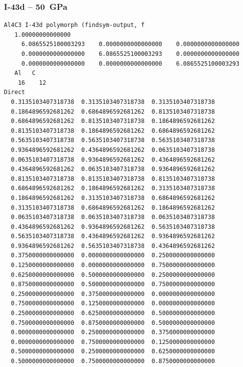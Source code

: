 \subsubsection*{I-43d -- 50~GPa}
\begin{footnotesize}
\begin{verbatim}
Al4C3 I-43d polymorph (findsym-output, f
   1.00000000000000     
     6.0865525100003293    0.0000000000000000    0.0000000000000000
     0.0000000000000000    6.0865525100003293    0.0000000000000000
     0.0000000000000000    0.0000000000000000    6.0865525100003293
   Al   C 
    16    12
Direct
  0.3135103407318738  0.3135103407318738  0.3135103407318738
  0.1864896592681262  0.6864896592681262  0.8135103407318738
  0.6864896592681262  0.8135103407318738  0.1864896592681262
  0.8135103407318738  0.1864896592681262  0.6864896592681262
  0.5635103407318738  0.5635103407318738  0.5635103407318738
  0.9364896592681262  0.4364896592681262  0.0635103407318738
  0.0635103407318738  0.9364896592681262  0.4364896592681262
  0.4364896592681262  0.0635103407318738  0.9364896592681262
  0.8135103407318738  0.8135103407318738  0.8135103407318738
  0.6864896592681262  0.1864896592681262  0.3135103407318738
  0.1864896592681262  0.3135103407318738  0.6864896592681262
  0.3135103407318738  0.6864896592681262  0.1864896592681262
  0.0635103407318738  0.0635103407318738  0.0635103407318738
  0.4364896592681262  0.9364896592681262  0.5635103407318738
  0.5635103407318738  0.4364896592681262  0.9364896592681262
  0.9364896592681262  0.5635103407318738  0.4364896592681262
  0.3750000000000000  0.0000000000000000  0.2500000000000000
  0.1250000000000000  0.0000000000000000  0.7500000000000000
  0.6250000000000000  0.5000000000000000  0.2500000000000000
  0.8750000000000000  0.5000000000000000  0.7500000000000000
  0.2500000000000000  0.3750000000000000  0.0000000000000000
  0.7500000000000000  0.1250000000000000  0.0000000000000000
  0.2500000000000000  0.6250000000000000  0.5000000000000000
  0.7500000000000000  0.8750000000000000  0.5000000000000000
  0.0000000000000000  0.2500000000000000  0.3750000000000000
  0.0000000000000000  0.7500000000000000  0.1250000000000000
  0.5000000000000000  0.2500000000000000  0.6250000000000000
  0.5000000000000000  0.7500000000000000  0.8750000000000000
 

\end{verbatim}
\end{footnotesize}

